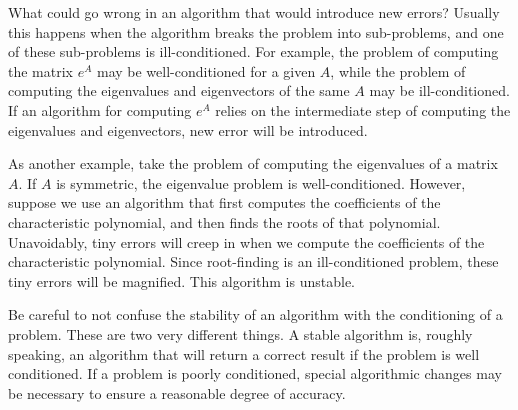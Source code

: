 What could go wrong in an algorithm that would introduce new errors? Usually this happens when the algorithm breaks the problem into sub-problems, and one of these sub-problems is ill-conditioned. For example, the problem of computing the matrix $e^A$ may be well-conditioned for a given $A$, while the problem of computing the eigenvalues and eigenvectors of the same $A$ may be ill-conditioned. If an algorithm for computing $e^A$ relies on the intermediate step of computing the eigenvalues and eigenvectors, new error will be introduced. 

As another example, take the problem of computing the eigenvalues of a matrix $A$. If $A$ is symmetric, the eigenvalue problem is well-conditioned. However, suppose we use an algorithm that first computes the coefficients of the characteristic polynomial, and then finds the roots of that polynomial. Unavoidably, tiny errors will creep in when we compute the coefficients of the characteristic polynomial. Since root-finding is an ill-conditioned problem, these tiny errors will be magnified. This algorithm is unstable.

\begin{warn}
Be careful to not confuse the stability of an algorithm with the conditioning of a problem.
These are two very different things.
A stable algorithm is, roughly speaking, an algorithm that will return a correct result if the problem is well conditioned.
If a problem is poorly conditioned, special algorithmic changes may be necessary to ensure a reasonable degree of accuracy.
\end{warn}

